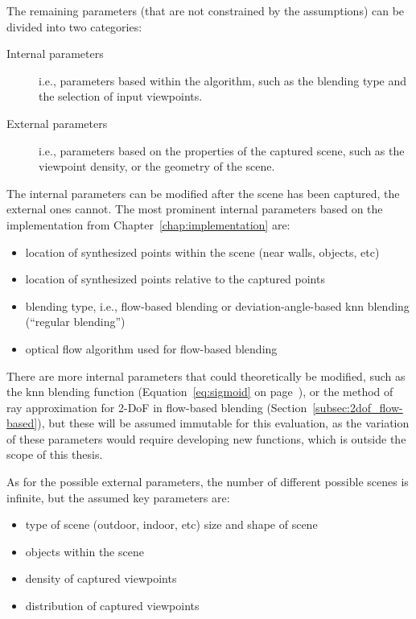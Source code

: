 The remaining parameters (that are not constrained by the assumptions) can be divided into two categories: 
\begin{description}
    \item [Internal parameters] i.e., parameters based within the algorithm, such as the blending type and the selection of input viewpoints.
    \item [External parameters] i.e., parameters based on the properties of the captured scene, such as the viewpoint density, or the geometry of the scene.
\end{description}      

The internal parameters can be modified after the scene has been captured, the external ones cannot.  The most prominent internal parameters based on the implementation from Chapter~\ref{chap:implementation} are:

\begin{itemize}
  \item location of synthesized points within the scene (near walls, objects, etc)
  \item location of synthesized points relative to the captured points
  \item blending type, i.e., flow-based blending or deviation-angle-based knn blending (``regular blending'')
  \item optical flow algorithm used for flow-based blending
\end{itemize}

There are more internal parameters that could theoretically be modified, such as the knn blending function (Equation~\ref{eq:sigmoid} on page~\pageref{eq:sigmoid}), or the method of ray approximation for 2-DoF in flow-based blending (Section~\ref{subsec:2dof_flow-based}), but these will be assumed immutable for this evaluation, as the variation of these parameters would require developing new functions, which is outside the scope of this thesis.

As for the possible external parameters, the number of different possible scenes is infinite, but the assumed key parameters are:
\begin{itemize}
  \item type of scene (outdoor, indoor, etc) \ar size and shape of scene
  \item objects within the scene
  \item density of captured viewpoints
  \item distribution of captured viewpoints
\end{itemize}

